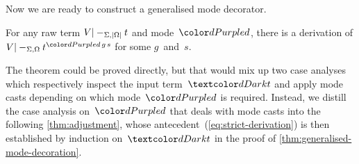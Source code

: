 
Now we are ready to construct a generalised mode decorator.

\begin{theorem}\label{thm:generalised-mode-decoration}
For any raw term $V |-_{\Sigma,\left|\Omega\right|} t$ and mode~$\dir{d}$, there is a derivation of $V |-_{\Sigma,\Omega} t^{\dir{d}\,g\,s}$ for some $g$~and~$s$.
\end{theorem}

The theorem could be proved directly, but that would mix up two case analyses which respectively inspect the input term~$\isTerm{t}$ and apply mode casts depending on which mode~$\dir{d}$ is required.
Instead, we distill the case analysis on~$\dir{d}$ that deals with mode casts into the following \cref{thm:adjustment}, whose antecedent~(\ref{eq:strict-derivation}) is then established by induction on~$\isTerm{t}$ in the proof of \cref{thm:generalised-mode-decoration}.

